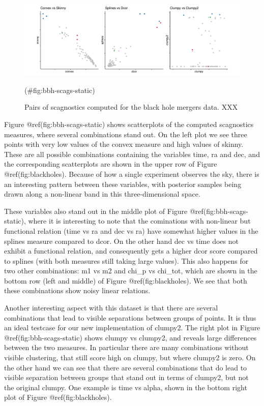 \begin{Schunk}
\begin{figure}
\includegraphics[width=1\linewidth]{mason-lee-laa-cook_files/figure-latex/bbh-scags-static-1} \caption[Pairs of scagnostics computed for the black hole mergers data]{Pairs of scagnostics computed for the black hole mergers data. XXX}(\#fig:bbh-scags-static)
\end{figure}
\end{Schunk}

Figure @ref(fig:bbh-scags-static) shows scatterplots of the computed
scagnostics measures, where several combinations stand out. On the left
plot we see three points with very low values of the convex measure and
high values of skinny. These are all possible combinations containing
the variables time, ra and dec, and the corresponding scatterplots are
shown in the upper row of Figure @ref(fig:blackholes). Because of how a
single experiment observes the sky, there is an interesting pattern
between these variables, with posterior samples being drawn along a
non-linear band in this three-dimensional space.

These variables also stand out in the middle plot of Figure
@ref(fig:bbh-scags-static), where it is interesting to note that the
cominations with non-linear but functional relation (time vs ra and dec
vs ra) have somewhat higher values in the splines measure compared to
dcor. On the other hand dec vs time does not exhibit a functional
relation, and consequently gets a higher dcor score compared to splines
(with both measures still taking large values). This also happens for
two other combinations: m1 vs m2 and chi\_p vs chi\_tot, which are shown
in the bottom row (left and middle) of Figure @ref(fig:blackholes). We
see that both these combinations show noisy linear relations.

Another interesting aspect with this dataset is that there are several
combinations that lead to visible separations between groups of points.
It is thus an ideal testcase for our new implementation of clumpy2. The
right plot in Figure @ref(fig:bbh-scags-static) shows clumpy vs clumpy2,
and reveals large differences between the two measures. In particular
there are many combinations without visible clustering, that still score
high on clumpy, but where clumpy2 is zero. On the other hand we can see
that there are several combinations that do lead to visible separation
between groups that stand out in terms of clumpy2, but not the original
clumpy. One example is time vs alpha, shown in the bottom right plot of
Figure @ref(fig:blackholes).

